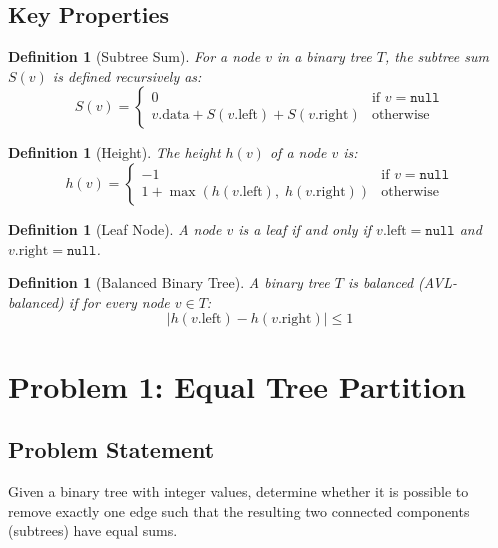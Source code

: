 \documentclass[10pt,journal,compsoc,onecolumn]{IEEEtran}
\newtheorem{definition}[theorem]{Definition}
\begin{document}
\subsection{Key Properties}

\begin{definition}[Subtree Sum]
For a node $v$ in a binary tree $T$, the \emph{subtree sum} $S(v)$ is defined recursively as:
\[
S(v) = \begin{cases}
0 & \text{if } v = \texttt{null} \\
v.\text{data} + S(v.\text{left}) + S(v.\text{right}) & \text{otherwise}
\end{cases}
\]
\end{definition}

\begin{definition}[Height]
The \emph{height} $h(v)$ of a node $v$ is:
\[
h(v) = \begin{cases}
-1 & \text{if } v = \texttt{null} \\
1 + \max(h(v.\text{left}),\; h(v.\text{right})) & \text{otherwise}
\end{cases}
\]
\end{definition}

\begin{definition}[Leaf Node]
A node $v$ is a \emph{leaf} if and only if $v.\text{left} = \texttt{null}$ and $v.\text{right} = \texttt{null}$.
\end{definition}

\begin{definition}[Balanced Binary Tree]
A binary tree $T$ is \emph{balanced} (AVL-balanced) if for every node $v \in T$:
\[
|h(v.\text{left}) - h(v.\text{right})| \leq 1
\]
\end{definition}

\section{Problem 1: Equal Tree Partition}
\label{sec:partition}

\subsection{Problem Statement}

Given a binary tree with integer values, determine whether it is possible to remove exactly one edge such that the resulting two connected components (subtrees) have equal sums.
\end{document}

